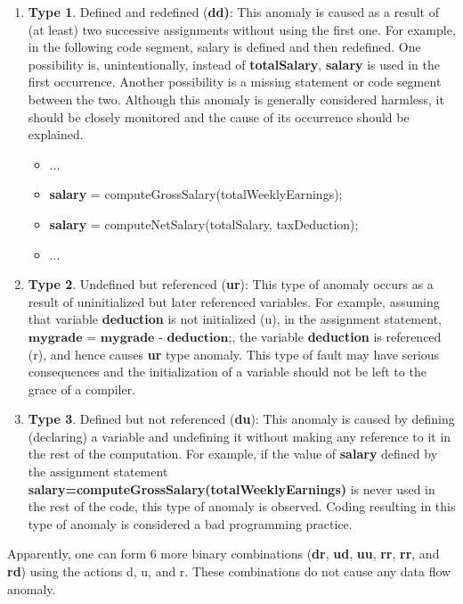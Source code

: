 \begin{enumerate}
    \item \textbf{Type 1}. Defined and redefined (\textbf{dd)}: This anomaly is caused as a result of (at least) two successive assignments without using the first  one. For example, in the following code segment, salary is defined and then redefined. One possibility is, unintentionally, instead of \textbf{totalSalary}, \textbf{salary} is used in the first occurrence. Another possibility is a missing statement or code segment between the two. Although this anomaly is generally considered harmless, it should be closely monitored and the cause of its occurrence should be explained.
    \begin{itemize}
        \item ...
        \item \textbf{salary} = computeGrossSalary(totalWeeklyEarnings);
        \item \textbf{salary} = computeNetSalary(totalSalary, taxDeduction); 
        \item ...
    \end{itemize}
    
    \item \textbf{Type 2}. Undefined but referenced (\textbf{ur}): This type of anomaly occurs as a result of uninitialized but later referenced variables. For example, assuming that variable \textbf{deduction} is not initialized (u), in the assignment statement, $\textbf{mygrade = mygrade - deduction;}$, the variable \textbf{deduction} is referenced (r), and hence causes \textbf{ur} type anomaly. This type of fault may have serious consequences and the initialization of a variable should not be left to the grace of a compiler.
    \item \textbf{Type 3}. Defined but not referenced (\textbf{du}): This anomaly is caused by defining (declaring) a variable and undefining it without making any reference to it in the rest of the computation.  For example, if the value of \textbf{salary} defined by the assignment statement \textbf{salary=computeGrossSalary(totalWeeklyEarnings)} is never used in the rest of the code, this type of anomaly is observed. Coding resulting in this type of anomaly is considered a bad programming practice.
\end{enumerate}
Apparently, one can form 6 more binary combinations (\textbf{dr}, \textbf{ud}, \textbf{uu}, \textbf{rr}, \textbf{rr}, and \textbf{rd}) using the actions d, u, and r. These combinations do not cause any data flow anomaly.

